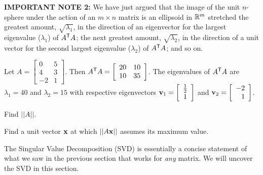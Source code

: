 \noindent \textbf{IMPORTANT NOTE 2:} We have just argued that the image of the unit $n$-sphere under the action of an $m \times n$ matrix is an ellipsoid in $\mathbb{R}^m$ stretched the greatest amount, $\sqrt{\lambda_1}$, in the direction of an eigenvector for the largest eigenvalue ($\lambda_1$) of $A^{\mathsf{T}}A$; the next greatest amount, $\sqrt{\lambda_2}$, in the direction of a unit vector for the second largest eigenvalue ($\lambda_2$) of $A^{\mathsf{T}}A$; and so on.


\begin{activity}  Let $A = \left[ \begin{array}{rc} 0&5\\ 4&3 \\ -2&1\end{array} \right].$ Then $A^{\mathsf{T}}A = \left[ \begin{array}{cc} 20&10\\ 10&35\end{array}
 \right]$. The eigenvalues of $A^{\mathsf{T}}A$ are $\lambda_1 = 40$ and $\lambda_2 = 15$ with respective eigenvectors $\mathbf{v}_1 = \left[ \begin{array}{c} \frac{1}{2} \\ 1 \end{array} \right]$ and $\mathbf{v}_2 = \left[ \begin{array}{r} -2 \\ 1 \end{array} \right]$.
 	\ba
	\item Find $||A||$.
	
	\item Find a unit vector $\mathbf{x}$ at which $||A\mathbf{x}||$ assumes its maximum value.
	
	\ea
\end{activity}


	
	

	



The Singular Value Decomposition (SVD) is essentially a concise statement of what we saw in the previous section that works for \emph{any} matrix. We will uncover the SVD in this section.

